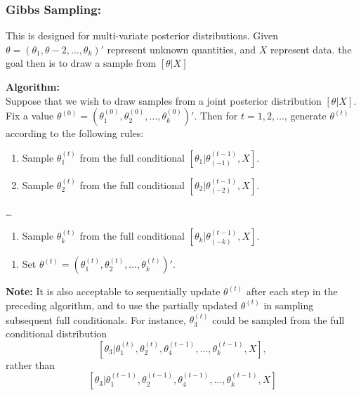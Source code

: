 				\subsubsection{Gibbs Sampling:}
					This is designed for multi-variate posterior distributions. Given $\theta=(\theta_1,\theta-2,\dots,\theta_k)'$ represent unknown quantities, and $X$ represent data. the goal then is to draw a sample from $[\theta|X]$

					\textbf{Algorithm:}\\
					Suppose that we wish to draw samples from a joint posterior distribution $[\theta|X]$.\\
					Fix a value $\theta^{(0)} = (\theta^{(0)}_1 ,\theta^{(0)}_2,\dots ,\theta^{(0)}_k)'$. Then for $t= 1,2,\dots$, generate $\theta^{(t)}$ according to the following rules:

					\begin{enumerate}
						\item Sample $\theta_1^{(t)}$ from the full conditional $[\theta_1|\theta^{(t-1)}_{(-1)},X]$.
						\item Sample $\theta_2^{(t)}$ from the full conditional $[\theta_2|\theta^{(t-1)}_{(-2)},X]$.
					\end{enumerate}
					\dots
					\begin{enumerate}
						\item Sample $\theta_k^{(t)}$ from the full conditional $[\theta_k|\theta^{(t-1)}_{(-k)},X]$.
					\end{enumerate}
					\begin{enumerate}
						\item Set  $\theta^{(t)} = (\theta^{(t)}_1 ,\theta^{(t)}_2,\dots ,\theta^{(t)}_k)'$.
					\end{enumerate}

					\textbf{Note:} It is also acceptable to sequentially update $\theta^{(t)}$ after each step in the preceding algorithm, and to use the partially updated $\theta^{(t)}$ in sampling subsequent full conditionals. For instance, $\theta^{(t)}_3$ could be sampled from the full conditional distribution
					\[
						[\theta_3|\theta_1^{(t)},\theta_2^{(t)},\theta_4^{(t-1)},\dots,\theta_k^{(t-1)},X],
					\]rather than
					\[
						[\theta_3|\theta_1^{(t-1)},\theta_2^{(t-1)},\theta_4^{(t-1)},\dots,\theta_k^{(t-1)},X]
					\]


